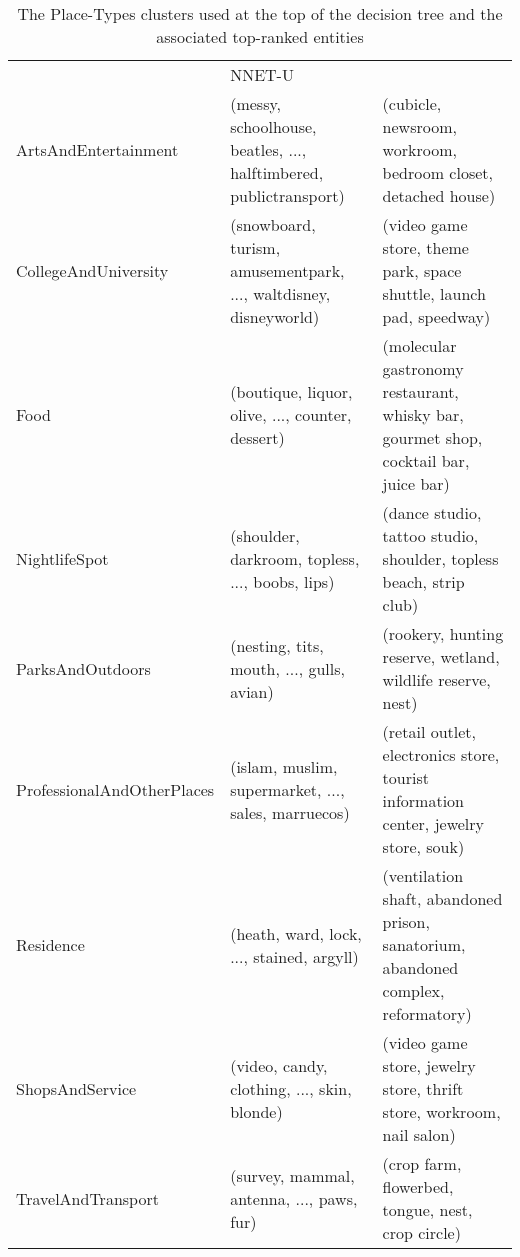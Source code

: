 \begin{landscape}
\begin{table}[]
\begin{tabular}{lll}
& NNET-U                                                                                    &                                                                                                     \\
ArtsAndEntertainment       & (messy, schoolhouse, beatles, ..., halftimbered, publictransport)                         & (cubicle, newsroom, workroom, bedroom closet, detached house)                                       \\
CollegeAndUniversity       & (snowboard, turism, amusementpark, ..., waltdisney, disneyworld)                          & (video game store, theme park, space shuttle, launch pad, speedway)                                 \\
Food                       & (boutique, liquor, olive, ..., counter, dessert)                                          & (molecular gastronomy restaurant, whisky bar, gourmet shop, cocktail bar, juice bar)                \\
NightlifeSpot              & (shoulder, darkroom, topless, ..., boobs, lips)                                           & (dance studio, tattoo studio, shoulder, topless beach, strip club)                                  \\
ParksAndOutdoors           & (nesting, tits, mouth, ..., gulls, avian)                                                 & (rookery, hunting reserve, wetland, wildlife reserve, nest)                                         \\
ProfessionalAndOtherPlaces & (islam, muslim, supermarket, ..., sales, marruecos)                                       & (retail outlet, electronics store, tourist information center, jewelry store, souk)                 \\
Residence                  & (heath, ward, lock, ..., stained, argyll)                                                 & (ventilation shaft, abandoned prison, sanatorium, abandoned complex, reformatory)                   \\
ShopsAndService            & (video, candy, clothing, ..., skin, blonde)                                               & (video game store, jewelry store, thrift store, workroom, nail salon)                               \\
TravelAndTransport         & (survey, mammal, antenna, ..., paws, fur)                                                 & (crop farm, flowerbed, tongue, nest, crop circle)                                                  
                                              
	\end{tabular}\caption{The Place-Types clusters used at the top of the decision tree and the associated top-ranked entities}\label{ch5:placeent}
\end{table}
\end{landscape}


